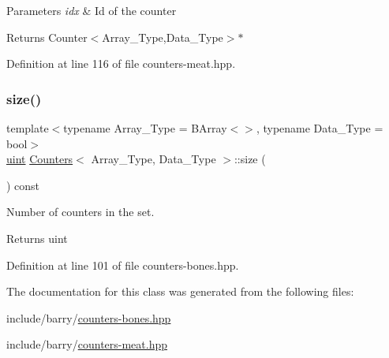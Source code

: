 \begin{DoxyParams}{Parameters}
{\em idx} & Id of the counter \\
\hline
\end{DoxyParams}
\begin{DoxyReturn}{Returns}
Counter$<$\+Array\+\_\+\+Type,\+Data\+\_\+\+Type$>$$\ast$ 
\end{DoxyReturn}


Definition at line 116 of file counters-\/meat.\+hpp.

\mbox{\label{class_counters_af213b17c55496b565ad6ce7a9b0a56e1}} 
\subsubsection{\texorpdfstring{size()}{size()}}
{\footnotesize\ttfamily template$<$typename Array\+\_\+\+Type = B\+Array$<$$>$, typename Data\+\_\+\+Type = bool$>$ \\
\hyperlink{typedefs_8hpp_a91ad9478d81a7aaf2593e8d9c3d06a14}{uint} \hyperlink{class_counters}{Counters}$<$ Array\+\_\+\+Type, Data\+\_\+\+Type $>$\+::size (\begin{DoxyParamCaption}{ }\end{DoxyParamCaption}) const\hspace{0.3cm}{\ttfamily [inline]}}



Number of counters in the set. 

\begin{DoxyReturn}{Returns}
uint 
\end{DoxyReturn}


Definition at line 101 of file counters-\/bones.\+hpp.



The documentation for this class was generated from the following files\+:\begin{DoxyCompactItemize}
\item 
include/barry/\hyperlink{counters-bones_8hpp}{counters-\/bones.\+hpp}\item 
include/barry/\hyperlink{counters-meat_8hpp}{counters-\/meat.\+hpp}\end{DoxyCompactItemize}
